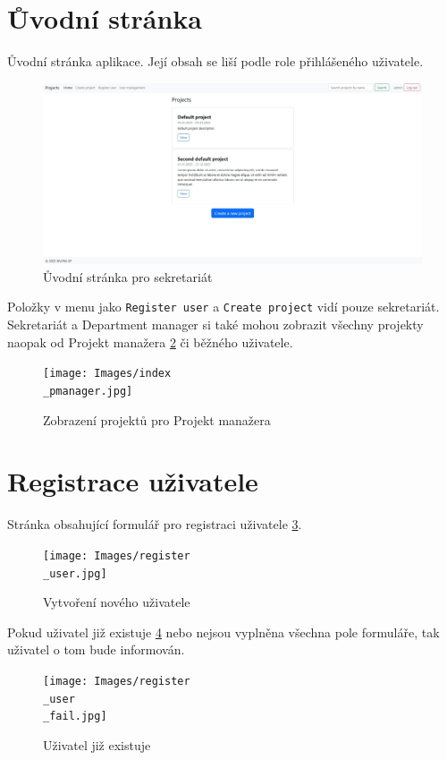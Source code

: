\documentclass[czech,P5]{thesiskiv}
\begin{document}
\section{Ůvodní stránka}
Ůvodní stránka aplikace. Její obsah se liší podle role přihlášeného uživatele.
\begin{figure}[H]
	\centering
	\includegraphics[width=\textwidth]{Images/index.jpg}
	\caption{Ůvodní stránka pro sekretariát}
	\label{fig:index} 
\end{figure}
Položky v menu jako \texttt{Register user} a \texttt{Create project} vidí pouze sekretariát. Sekretariát a Department manager si také mohou zobrazit všechny projekty naopak od Projekt manažera \ref{fig:indexpmanager} či běžného uživatele.
\begin{figure}[H]
	\centering
	\texttt{[image: Images/index\\\_pmanager.jpg]}
	\caption{Zobrazení projektů pro Projekt manažera}
	\label{fig:indexpmanager} 
\end{figure}

\section{Registrace uživatele}
Stránka obsahující formulář pro registraci uživatele \ref{fig:reg}.
\begin{figure}[H]
	\centering
	\texttt{[image: Images/register\\\_user.jpg]}
	\caption{Vytvoření nového uživatele}
	\label{fig:reg} 
\end{figure}
\newpage
 Pokud uživatel již existuje \ref{fig:regfail} nebo nejsou vyplněna všechna pole formuláře, tak uživatel o tom bude informován.
 \begin{figure}[H]
	\centering
	\texttt{[image: Images/register\\\_user\\\_fail.jpg]}
	\caption{Uživatel již existuje}
	\label{fig:regfail} 
\end{figure}
\newpage
\end{document}
